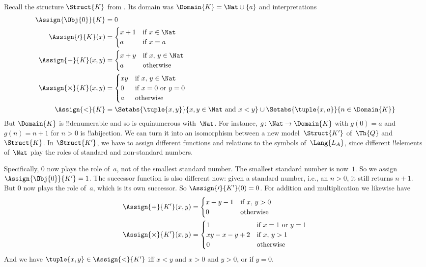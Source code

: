 \documentclass[../../../include/open-logic-section]{subfiles}
\begin{document}
\begin{ex}
Recall the structure $\Struct{K}$ from .
Its domain was $\Domain{K} = \Nat
\cup \{a\}$ and interpretations
\begin{align*}
  \Assign{\Obj{0}}{K} & = 0\\
  \Assign{\prime}{K}(x) & =
  \begin{cases}
    x+1 & \text{if $x\in \Nat$}\\
    a & \text{if $x = a$}
  \end{cases}\\
  \Assign{+}{K}(x, y) & =
  \begin{cases}
    x+y & \text{if $x$, $y \in\Nat$}\\
    a & \text{otherwise}
  \end{cases}\\
  \Assign{\times}{K}(x, y) & =
  \begin{cases}
    xy & \text{if $x$, $y \in\Nat$}\\
    0 & \text{if $x=0$ or $y=0$}\\
    a & \text{otherwise}\\
  \end{cases}\\
  \Assign{<}{K} & =
  \Setabs{\tuple{x,y}}{x, y \in \Nat \text{ and } x<y} \cup
  \Setabs{\tuple{x,a}}{n \in \Domain{K}}
\end{align*}
But $\Domain{K}$ is !!{denumerable} and so is equinumerous
with~$\Nat$. For instance, $g\colon \Nat \to \Domain{K}$ with $g(0) =
a$ and $g(n) = n+1$ for $n>0$ is !!a{bijection}.  We can turn it into
an isomorphism between a new model~$\Struct{K'}$ of~$\Th{Q}$ and
$\Struct{K}$.  In $\Struct{K'}$, we have to assign different functions
and relations to the symbols of~$\Lang{L_A}$, since different
!!{element}s of~$\Nat$ play the roles of standard and non-standard
numbers.

Specifically, $0$ now plays the role of~$a$, not of the smallest
standard number. The smallest standard number is now~$1$. So we assign
$\Assign{\Obj{0}}{K'} = 1$. The successor function is also different
now: given a standard number, i.e., an $n > 0$, it still returns
$n+1$. But $0$ now plays the role of~$a$, which is its own
successor. So $\Assign{\prime}{K'}(0) = 0$.  For addition and
multiplication we likewise have
\begin{align*}
\Assign{+}{K'}(x, y) & =
  \begin{cases}
    x+y-1 & \text{if $x$, $y >0$}\\
    0 & \text{otherwise}
  \end{cases}\\
  \Assign{\times}{K'}(x, y) & =
  \begin{cases}
    1 & \text{if $x = 1$ or $y = 1$}\\
    xy - x - y + 2 & \text{if $x$, $y > 1$}\\
    0 & \text{otherwise}\\
  \end{cases}
\end{align*}
And we have $\tuple{x, y} \in \Assign{<}{K'}$ iff $x < y$ and $x > 0$
and $y > 0$, or if $y = 0$.


\end{ex}
\end{document}
